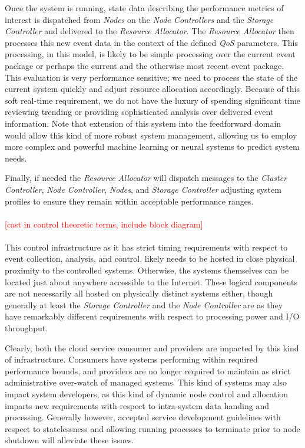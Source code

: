 \documentclass[times, 10pt,twocolumn]{article}
\begin{document}
Once the system is running, state data describing the performance metrics of interest is dispatched from \textit{Nodes} on the \textit{Node Controllers} and the \textit{Storage Controller} and delivered to the \textit{Resource Allocator}.  The \textit{Resource Allocator} then processes this new event data in the context of the defined \textit{QoS} parameters.  This processing, in this model, is likely to be simple processing over the current event package or perhaps the current and the otherwise most recent event package.  This evaluation is very performance sensitive; we need to process the state of the current system quickly and adjust resource allocation accordingly.  Because of this soft real-time requirement, we do not have the luxury of spending significant time reviewing trending or providing sophisticated analysis over delivered event information.  Note that extension of this system into the feedforward domain would allow this kind of more robust system management, allowing us to employ more complex and powerful machine learning or neural systems to predict system needs.

Finally, if needed the \textit{Resource Allocator} will dispatch messages to the \textit{Cluster Controller}, \textit{Node Controller}, \textit{Nodes}, and \textit{Storage Controller} adjusting system profiles to ensure they remain within acceptable performance ranges.
\\
\\
\textcolor{red}{[cast in control theoretic terms, include block diagram]}
\\
\\
This control infrastructure as it has strict timing requirements with respect to event collection, analysis, and control, likely needs to be hosted in close physical proximity to the controlled systems.  Otherwise, the systems themselves can be located just about anywhere accessible to the Internet.  These logical components are not necessarily all hosted on physically distinct systems either, though generally at least the \textit{Storage Controller} and the \textit{Node Controller} are as they have remarkably different requirements with respect to processing power and I/O throughput.

Clearly, both the cloud service consumer and providers are impacted by this kind of infrastructure.  Consumers have systems performing within required performance bounds, and providers are no longer required to maintain as strict administrative over-watch of managed systems.  This kind of systems may also impact system developers, as this kind of dynamic node control and allocation imparts new requirements with respect to intra-system data handing and processing.  Generally however, accepted service development guidelines with respect to statelessness and allowing running processes to terminate prior to node shutdown will alleviate these issues.
\end{document}
